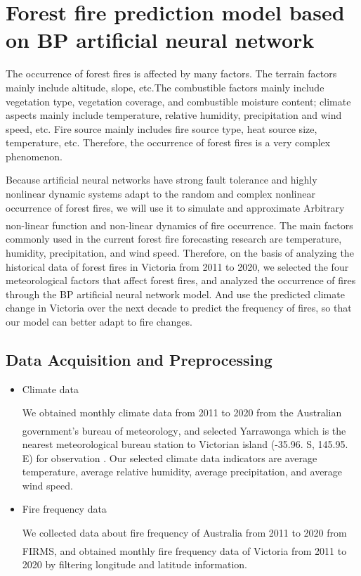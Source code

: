 \documentclass{mcmthesis}
\newcommand{\upcite}[1]{\textsuperscript{\textsuperscript{\cite{#1}}}}
\begin{document}
\section{Forest fire prediction model based on BP artificial neural network}
The occurrence of forest fires is affected by many factors. The terrain factors mainly include altitude, slope, etc.The combustible factors mainly include vegetation type, vegetation coverage, and combustible moisture content; climate aspects mainly include temperature, relative humidity, precipitation and wind speed, etc. Fire source mainly includes fire source type, heat source size, temperature, etc. Therefore, the occurrence of forest fires is a very complex phenomenon.

Because artificial neural networks have strong fault tolerance and highly nonlinear dynamic systems adapt to the random and complex nonlinear occurrence of forest fires, we will use it to simulate and approximate Arbitrary non-linear function and non-linear dynamics of fire occurrence. \upcite{c_BP}The main factors commonly used in the current forest fire forecasting research are temperature, humidity, precipitation, and wind speed. Therefore, on the basis of analyzing the historical data of forest fires in Victoria from 2011 to 2020, we selected the four meteorological factors that affect forest fires, and analyzed the occurrence of fires through the BP artificial neural network model. And use the predicted climate change in Victoria over the next decade to predict the frequency of fires, so that our model can better adapt to fire changes.

\subsection{Data Acquisition and Preprocessing}
\begin{itemize}
  \item Climate data
  
  We obtained monthly climate data from 2011 to 2020 from the Australian government's bureau of meteorology\upcite{climate_website}, and selected Yarrawonga which is the nearest meteorological bureau station  to Victorian island (-35.96. S, 145.95. E) for observation . Our selected climate data indicators are average temperature, average relative humidity, average precipitation, and average wind speed.
  
  \item Fire frequency data
  
  We collected data about fire frequency of Australia from 2011 to 2020 from FIRMS\upcite{fire_webcite}, and obtained monthly fire frequency data of Victoria from 2011 to 2020 by filtering longitude and latitude information.

\end{itemize}
\end{document}
